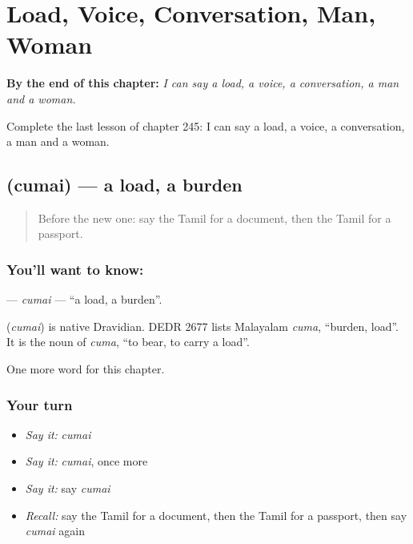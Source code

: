 
\chapter{Load, Voice, Conversation, Man, Woman}
\label{ch:ta-load-voice-conversation-man-woman}

\begin{chapteropening}
\textbf{By the end of this chapter:} \emph{I can say a load, a voice, a conversation, a man and a woman.}

Complete the last lesson of chapter 245: I can say a load, a voice, a conversation, a man and a woman.
\end{chapteropening}

\section[\texorpdfstring{\ta{சுமை} (cumai)}{சுமை (cumai)}]{ (cumai) — a load, a burden}

\label{lesson:TA-C245-cumai}



\begin{quote}
Before the new one: say the Tamil for a document, then the Tamil for a passport.
\end{quote}

\subsection*{You'll want to know: }
\textbf{} — \emph{cumai} — \textquotedblleft{}a load, a burden\textquotedblright{}.

\begin{cousinweb}
\textbf{} (\emph{cumai}) is native Dravidian. DEDR 2677 lists Malayalam \emph{cuma}, \textquotedblleft{}burden, load\textquotedblright{}. It is the noun of \emph{cuma}, \textquotedblleft{}to bear, to carry a load\textquotedblright{}.
\end{cousinweb}

\begin{grammarlens}[title={What you've built}]
One more word for this chapter.
\end{grammarlens}

\subsection*{Your turn}
\begin{itemize}
\raggedright
  \item \emph{Say it:} \emph{cumai}
  \item \emph{Say it:} \emph{cumai}, once more
  \item \emph{Say it:} say \emph{cumai}
  \item \emph{Recall:} say the Tamil for a document, then the Tamil for a passport, then say \emph{cumai} again
\end{itemize}

